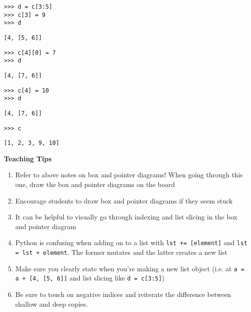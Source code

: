 \begin{blocksection}

\begin{lstlisting}
>>> d = c[3:5]
>>> c[3] = 9
>>> d

\end{lstlisting}
\begin{solution}[.25in]
\begin{lstlisting}
[4, [5, 6]]
\end{lstlisting}
\end{solution}

\begin{lstlisting}
>>> c[4][0] = 7
>>> d
\end{lstlisting}
\begin{solution}[.25in]
\begin{lstlisting}
[4, [7, 6]]
\end{lstlisting}
\end{solution}
\end{blocksection}
\begin{blocksection}
\begin{lstlisting}
>>> c[4] = 10
>>> d
\end{lstlisting}
\begin{solution}[.25in]
\begin{lstlisting}
[4, [7, 6]]
\end{lstlisting}
\end{solution}

\begin{lstlisting}
>>> c
\end{lstlisting}
\begin{solution}[.25in]
\begin{lstlisting}
[1, 2, 3, 9, 10]
\end{lstlisting}
\end{solution}

\end{blocksection}
    
\begin{questionmeta}
    \textbf{Teaching Tips}
    \begin{enumerate}
            \item Refer to above notes on box and pointer diagrams! When going through this one, draw the box and pointer diagrams on the board
            \item Encourage students to draw box and pointer diagrams if they seem stuck
            \item It can be helpful to visually go through indexing and list slicing in the box and pointer diagram
            \item Python is confusing when adding on to a list with \lstinline{lst += [element]} and \lstinline{lst = lst + element}. The former mutates and the latter creates a new list
            \item Make sure you clearly state when you’re making a new list object (i.e. at \lstinline{a = a + [4, [5, 6]]} and list slicing like \lstinline{d = c[3:5]})
            \item Be sure to touch on negative indices and reiterate the difference between shallow and deep copies.
    \end{enumerate}
\end{questionmeta}